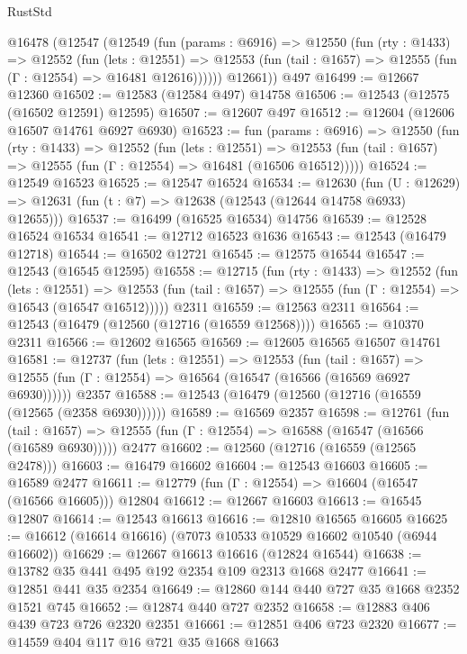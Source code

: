 \begin{lexlean}{RustStd}
\begin{coremodule}
    @16478
      (@12547
        (@12549
          (fun (params : @6916) =>
          @12550
            (fun (rty : @1433) =>
            @12552
              (fun (lets : @12551) =>
              @12553 (fun (tail : @1657) => @12555 (fun (Γ : @12554) => @16481 @12616))))))
        @12661))
    @497
@16499 := @12667 @12360
@16502 := @12583 (@12584 @497) @14758
@16506 := @12543 (@12575 (@16502 @12591) @12595)
@16507 := @12607 @497
@16512 := @12604 (@12606 @16507 @14761 @6927 @6930)
@16523 := fun (params : @6916) =>
  @12550
    (fun (rty : @1433) =>
    @12552
      (fun (lets : @12551) =>
      @12553 (fun (tail : @1657) => @12555 (fun (Γ : @12554) => @16481 (@16506 @16512)))))
@16524 := @12549 @16523
@16525 := @12547 @16524
@16534 := @12630
    (fun (U : @12629) => @12631 (fun (t : @7) => @12638 (@12543 (@12644 @14758 @6933) @12655)))
@16537 := @16499 (@16525 @16534) @14756
@16539 := @12528 @16524 @16534
@16541 := @12712 @16523 @1636
@16543 := @12543 (@16479 @12718)
@16544 := @16502 @12721
@16545 := @12575 @16544
@16547 := @12543 (@16545 @12595)
@16558 := @12715
    (fun (rty : @1433) =>
    @12552
      (fun (lets : @12551) =>
      @12553 (fun (tail : @1657) => @12555 (fun (Γ : @12554) => @16543 (@16547 @16512)))))
    @2311
@16559 := @12563 @2311
@16564 := @12543 (@16479 (@12560 (@12716 (@16559 @12568))))
@16565 := @10370 @2311
@16566 := @12602 @16565
@16569 := @12605 @16565 @16507 @14761
@16581 := @12737
    (fun (lets : @12551) =>
    @12553
      (fun (tail : @1657) =>
      @12555 (fun (Γ : @12554) => @16564 (@16547 (@16566 (@16569 @6927 @6930))))))
    @2357
@16588 := @12543 (@16479 (@12560 (@12716 (@16559 (@12565 (@2358 @6930))))))
@16589 := @16569 @2357
@16598 := @12761
    (fun (tail : @1657) => @12555 (fun (Γ : @12554) => @16588 (@16547 (@16566 (@16589 @6930)))))
    @2477
@16602 := @12560 (@12716 (@16559 (@12565 @2478)))
@16603 := @16479 @16602
@16604 := @12543 @16603
@16605 := @16589 @2477
@16611 := @12779 (fun (Γ : @12554) => @16604 (@16547 (@16566 @16605))) @12804
@16612 := @12667 @16603
@16613 := @16545 @12807
@16614 := @12543 @16613
@16616 := @12810 @16565 @16605
@16625 := @16612 (@16614 @16616) (@7073 @10533 @10529 @16602 @10540 (@6944 @16602))
@16629 := @12667 @16613 @16616 (@12824 @16544)
@16638 := @13782 @35 @441 @495 @192 @2354 @109 @2313 @1668 @2477
@16641 := @12851 @441 @35 @2354
@16649 := @12860 @144 @440 @727 @35 @1668 @2352 @1521 @745
@16652 := @12874 @440 @727 @2352
@16658 := @12883 @406 @439 @723 @726 @2320 @2351
@16661 := @12851 @406 @723 @2320
@16677 := @14559
    @404
    @117
    @16
    @721
    @35
    @1668
    @1663

\end{coremodule}
\end{lexlean}
